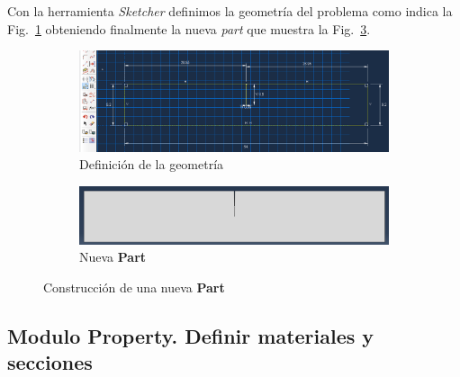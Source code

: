   Con la herramienta \textit{Sketcher} definimos la geometría del
  problema como indica la Fig.~\ref{part03} obteniendo finalmente la nueva
  \textit{part} que muestra la Fig.~\ref{part04}.
  \begin{figure}[!h]
    \centering
    \begin{subfigure}[!h]{1.0\textwidth}
      \includegraphics[width=\textwidth]{./body/images/part03}
      \caption{Definición de la geometría}
      \label{part03}
    \end{subfigure}%
    
    \begin{subfigure}[!h]{0.875\textwidth}
      \includegraphics[width=\textwidth]{./body/images/part04}
      \caption{Nueva \textbf{Part}}
      \label{part04}
    \end{subfigure}%
    \caption{Construcción de una nueva \textbf{Part}}
  \end{figure}

  \subsection{Modulo Property. Definir materiales y secciones}

